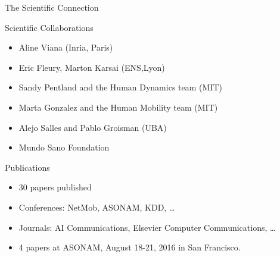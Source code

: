 \documentclass{beamer}
\begin{document}
\begin{frame}{The Scientific Connection}
\begin{block}{Scientific Collaborations}
\begin{itemize}
\item Aline Viana (Inria, Paris)
\item Eric Fleury, Marton Karsai (ENS,Lyon)
\item Sandy Pentland and the Human Dynamics team (MIT)
\item Marta Gonzalez and the Human Mobility team (MIT)
\item Alejo Salles and Pablo Groisman (UBA)
\item Mundo Sano Foundation
\end{itemize}
\end{block}

\pause

\begin{block}{Publications}
\begin{itemize}
\item 30 papers published
\item Conferences: NetMob, ASONAM, KDD, \ldots
\item Journals: AI Communications, Elsevier Computer Communications, \ldots
\item 4 papers at ASONAM, August 18-21, 2016 in San Francisco.
\end{itemize}
\end{block}

\bigskip

\cite{leo2015socioeconomic}
\cite{gonzalez2008understanding,sarraute2015city}
\cite{mcpherson2001birds}
\cite{sarraute2014}

\end{frame}
\end{document}
